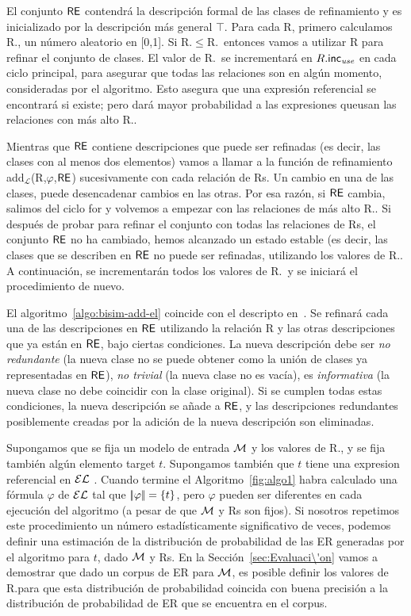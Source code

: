 El conjunto $\textsf{RE}$ contendr\'a la descripci\'on formal de las clases de refinamiento
y es inicializado por la descripci\'on m\'as general $\top$.
Para cada R, primero calculamos R.\randomuse, un n\'umero aleatorio en [0,1].
Si R.\randomuse $\le$R.\puse\ entonces vamos a utilizar R para refinar el conjunto de
clases. El valor de R.\puse\ se incrementar\'a en $R.\textsf{inc}_\emph{use}$
en cada ciclo principal, para asegurar que todas las relaciones son en alg\'un momento,
consideradas por el algoritmo. Esto asegura que una expresi\'on referencial
se encontrar\'a si existe; pero dar\'a mayor probabilidad a las expresiones
queusan las relaciones con m\'as alto R.\puse.
 
Mientras que $\textsf{RE}$ contiene descripciones que puede ser refinadas (es decir, las clases
con al menos dos elementos) vamos a llamar a la funci\'on de refinamiento
add$_\mathcal{L}$(R,$\varphi$,$\textsf{RE} $) sucesivamente con cada relaci\'on
de Rs. Un cambio en una de las clases, puede desencadenar cambios en
las otras. Por esa raz\'on, si $\textsf{RE}$ cambia, salimos del ciclo for y volvemos a
empezar con las relaciones de m\'as alto R.\puse. Si despu\'es de probar
para refinar el conjunto con todas las relaciones de Rs, el conjunto $\textsf{RE}$ no ha
cambiado, hemos alcanzado un estado estable (es decir, las clases que se describen
en $\textsf{RE}$ no puede ser refinadas, utilizando los valores de R.\puse\). 
A continuaci\'on, se incrementar\'an todos los valores de R.\puse\ y se iniciar\'a el
procedimiento de nuevo.

El algoritmo~\ref{algo:bisim-add-el} coincide con el descripto
en~\cite{arec2:2008:Areces}. Se refinar\'a cada una de las descripciones
en $\textsf{RE}$ utilizando la relaci\'on R y las otras descripciones que ya est\'an en
$\textsf{RE}$, bajo ciertas condiciones. La nueva descripci\'on debe ser
\emph{no redundante} (la nueva clase no se puede obtener como la uni\'on de
clases ya representadas en $\textsf{RE}$), \emph{no trivial} (la nueva
clase no es vac\'{i}a), es \emph{informativa} (la nueva clase no debe
coincidir con la clase original). Si se cumplen todas estas condiciones,
la nueva descripci\'on se a\~nade a $\textsf{RE}$, y las descripciones redundantes
posiblemente creadas por la adici\'on de la nueva descripci\'on son
eliminadas.

Supongamos que se fija un modelo de entrada $\mathcal{M}$ y los valores de R.\puse, y se fija tambi\'en
alg\'un elemento target $t$. Supongamos tambi\'en que $t$ tiene una expresion referencial en 
$\mathcal{EL}$ . Cuando termine el
Algoritmo~\ref{fig:algo1} habra calculado una f\'ormula $\varphi$ de $\mathcal{EL}$ tal
que $|\!|\varphi|\!| = \{t\}$, pero $\varphi$ pueden ser diferentes en
cada ejecuci\'on del algoritmo (a pesar de que $\mathcal{M}$ y Rs son fijos). Si nosotros
repetimos este procedimiento un n\'umero estad\'{i}sticamente significativo de veces,
podemos definir una estimaci\'on de la distribuci\'on de probabilidad de las ER
generadas por el algoritmo para $t$, dado $\mathcal{M}$ y Rs. En la
Secci\'on~\ref{sec:Evaluaci\'on} vamos a demostrar que dado un corpus de ER
para $\mathcal{M}$, es posible definir los valores de R.\puse para que esta
distribuci\'on de probabilidad coincida con buena precisi\'on a la distribuci\'on de probabilidad
 de ER que se encuentra en el corpus.






